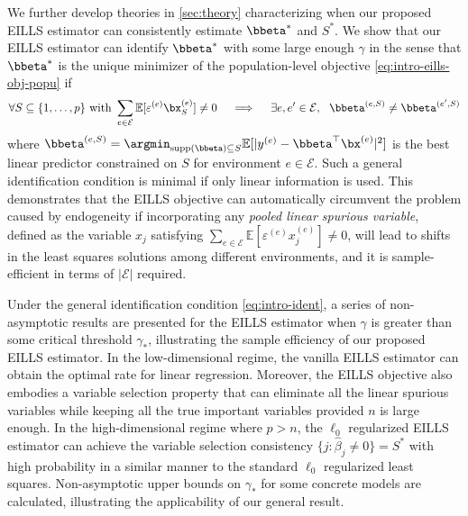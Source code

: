 \documentclass[10pt]{article}
\numberwithin{equation}{section}
\newcommand*{\supp}{\mathrm{supp}}
\begin{document}
{We further develop theories in \cref{sec:theory} characterizing when our proposed EILLS estimator can consistently estimate $\bbeta^*$ and $S^*$. We show that our EILLS estimator can identify $\bbeta^*$ with some large enough $\gamma$ in the sense that $\bbeta^*$ is the unique minimizer of the population-level objective \eqref{eq:intro-eills-obj-popu} if
\begin{align}
\label{eq:intro-ident}
    \forall S\subseteq \{1,\ldots, p\} ~\text{with}~ \sum_{e\in\mathcal{E}} \mathbb{E}[\varepsilon^{(e)} \bx^{(e)}_S] \neq 0 ~~~ \implies ~~~\exists e, e'\in \mathcal{E}, ~~\bbeta^{(e,S)} \neq \bbeta^{(e',S)}
\end{align} where $\bbeta^{(e,S)} = \argmin_{\supp(\bbeta) \subseteq S} \mathbb{E}[|y^{(e)} - \bbeta^\top \bx^{(e)}|^2]$ is the best linear predictor constrained on $S$ for environment $e\in \mathcal{E}$. Such a general identification condition is minimal if only linear information is used. This demonstrates that the EILLS objective can automatically circumvent the problem caused by endogeneity if incorporating any {\it pooled linear spurious variable}, defined as the variable $x_j$ satisfying $\sum_{e\in\mathcal{E}} \mathbb{E}[\varepsilon^{(e)} x^{(e)}_j] \neq 0$, will lead to shifts in the least squares solutions among different environments, and it is sample-efficient in terms of $|\mathcal{E}|$ required. 

Under the general identification condition \eqref{eq:intro-ident}, a series of non-asymptotic results are presented for the EILLS estimator when $\gamma$ is greater than some critical threshold $\gamma_*$, illustrating the sample efficiency of our proposed EILLS estimator. In the low-dimensional regime, the vanilla EILLS estimator can obtain the optimal rate for linear regression. Moreover, the EILLS objective also embodies a variable selection property that can eliminate all the linear spurious variables while keeping all the true important variables provided $n$ is large enough. In the high-dimensional regime where $p > n$, the $\ell_0$ regularized EILLS estimator can achieve the variable selection consistency $\{j: \hat{\beta}_{j} \neq 0\} = S^*$ with high probability in a similar manner to the standard $\ell_0$ regularized least squares. Non-asymptotic upper bounds on $\gamma_*$ for some concrete models are calculated, illustrating the applicability of our general result. 

}
\end{document}
